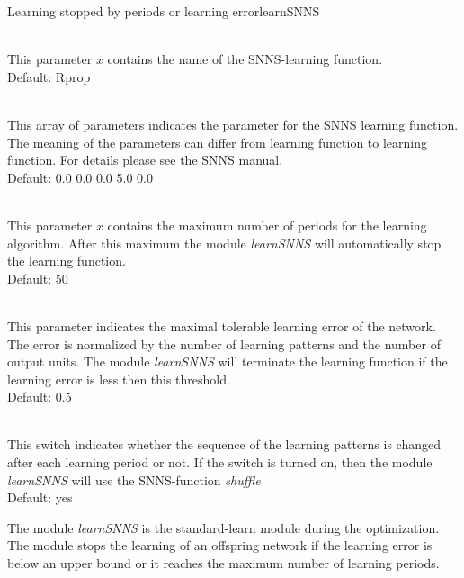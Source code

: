 \begin{moduledoc}{Learning stopped by periods or learning error}{learnSNNS}
  \item[\KeyWord{learnfct} \optParam{ x } ]~\\
    This parameter $x$  contains the name of the SNNS-learning function.\\
    Default: Rprop
  \item[\KeyWord{learnparam} \optParam{ x } ]~\\
    This array of parameters indicates the parameter for the SNNS learning function.
    The meaning of the parameters can differ from learning function to learning function.
    For details please see the SNNS manual.\\
    Default: 0.0 0.0 0.0 5.0 0.0
  \item[\KeyWord{maxepochs} \optParam{ x } ]~\\
    This parameter $x$ contains the maximum number of periods for the learning 
    algorithm. After this maximum the module {\it learnSNNS} will automatically stop the 
    learning function.\\
    Default: 50
  \item[\KeyWord{maxtss} \optParam{ x } ]~\\
    This parameter indicates the maximal tolerable learning error of the network.
    The error is normalized by the number of learning patterns and the number of output units.
    The module {\it learnSNNS} will terminate the learning function if the learning error
    is less then this threshold.\\
    Default: 0.5
  \item[\KeyWord{shuffle} \optParam{ x } ]~\\
    This switch indicates whether the sequence of the learning patterns is changed after
    each learning period or not.
    If the switch is turned on, then the module {\it learnSNNS} will use the
    SNNS-function {\it shuffle}\\
    Default: yes
\end{moduledoc}


The module {\it learnSNNS} is the standard-learn module during the optimization.
The module stops the learning of an offspring network if the learning error is below an 
upper bound or it reaches the maximum number of learning periods.



